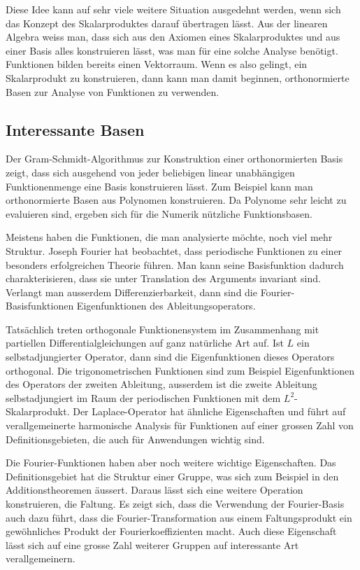 Diese Idee kann auf sehr viele weitere Situation ausgedehnt werden,
wenn sich das Konzept des Skalarproduktes darauf übertragen lässt.
Aus der linearen Algebra \cite{buch:linalg} weiss man, dass sich
aus den Axiomen eines 
Skalarproduktes und aus einer Basis alles konstruieren lässt, was
man für eine solche Analyse benötigt.
Funktionen bilden bereits einen Vektorraum.
%
Wenn es also gelingt,
ein Skalarprodukt zu konstruieren, dann kann man damit beginnen,
orthonormierte Basen zur Analyse von Funktionen zu verwenden.

%
%
\subsection{Interessante Basen}
Der Gram-Schmidt-Algorithmus zur Konstruktion einer orthonormierten
%
Basis zeigt, dass sich ausgehend von jeder beliebigen linear
unabhängigen Funktionenmenge eine Basis konstruieren lässt.
Zum Beispiel kann man orthonormierte Basen aus Polynomen konstruieren.
Da Polynome sehr leicht zu evaluieren sind, ergeben sich für die
Numerik nützliche Funktionsbasen.
%

Meistens haben die Funktionen, die man analysierte möchte, noch
viel mehr Struktur.
Joseph Fourier hat beobachtet, dass periodische Funktionen zu einer
%
besonders erfolgreichen Theorie führen.
Man kann seine Basisfunktion dadurch charakterisieren, dass sie
unter Translation des Arguments invariant sind.
Verlangt man ausserdem Differenzierbarkeit, dann sind die
Fourier-Basisfunktionen Eigenfunktionen des Ableitungsoperators.
%
%
%

Tatsächlich treten orthogonale Funktionensystem im Zusammenhang
mit partiellen Differentialgleichungen auf ganz natürliche Art auf.
Ist $L$ ein selbstadjungierter Operator, dann sind die Eigenfunktionen
dieses Operators orthogonal.
Die trigonometrischen Funktionen sind zum Beispiel Eigenfunktionen
des Operators der zweiten Ableitung, ausserdem ist die zweite
Ableitung selbstadjungiert im Raum der periodischen Funktionen
mit dem $L^2$-Skalarprodukt.
Der Laplace-Operator hat ähnliche Eigenschaften und führt
auf verallgemeinerte harmonische Analysis für Funktionen auf
einer grossen Zahl von Definitionsgebieten, die auch für
Anwendungen wichtig sind.

Die Fourier-Funktionen haben aber noch weitere wichtige Eigenschaften.
Das Definitionsgebiet hat die Struktur einer Gruppe, was sich zum
%
Beispiel in den Additionstheoremen äussert.
Daraus lässt sich eine weitere Operation konstruieren, die Faltung.
%
Es zeigt sich, dass die Verwendung der Fourier-Basis auch dazu führt,
dass die Fourier-Transformation aus einem Faltungsprodukt ein gewöhnliches
%
Produkt der Fourierkoeffizienten macht.
Auch diese Eigenschaft lässt sich auf eine grosse Zahl weiterer
Gruppen auf interessante Art verallgemeinern.

